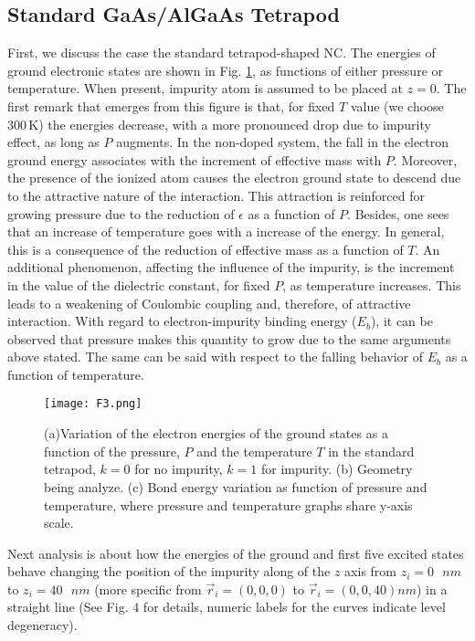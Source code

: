 \documentclass[nanomaterials,article,submit,moreauthors,pdftex]{Definitions/mdpi}
\begin{document}
\subsection{Standard GaAs/AlGaAs Tetrapod}
First, we discuss the case the standard tetrapod-shaped NC. The energies of ground electronic states are shown in Fig. \ref{F3}, as functions of either pressure or temperature. When present, impurity atom is assumed to be placed at $z=0$. The first remark that emerges from this figure is that, for fixed $T$ value (we choose $300\,$K) the energies decrease, with a more pronounced drop due to impurity effect, as long as $P$ augments. In the non-doped system, the fall in the electron ground energy associates with the increment of effective mass with $P$. Moreover, the presence of the ionized atom causes the electron ground state to descend due to the attractive nature of the interaction. This attraction is reinforced for growing pressure due to the reduction of $\epsilon$ as a function of $P$. Besides, one sees that an increase of temperature goes with a increase of the energy. In general, this is a consequence of the reduction of effective mass as a function of $T$. An additional phenomenon, affecting the influence of the impurity, is the increment in the value of the dielectric constant, for fixed $P$, as temperature increases. This leads to a weakening of Coulombic coupling and, therefore, of attractive interaction. With regard to electron-impurity binding energy ($E_b$), it can be observed that pressure makes this quantity to grow due to the same arguments above stated. The same can be said with respect to the falling behavior of $E_b$ as a function of temperature.

\begin{figure}[H]
	\centering	\texttt{[image: F3.png]}
	\caption{(a)Variation of the electron energies of the ground states as a function of the pressure, $P$ and the temperature $T$ in the standard tetrapod, $k=0$ for no impurity, $k=1$ for impurity. (b) Geometry being analyze. (c) Bond energy variation as function of pressure and temperature, where pressure and temperature graphs share y-axis scale.}
    \label{F3}
\end{figure}

Next analysis is about how the energies of the ground and first five excited states behave changing the position of the impurity along of the $z$ axis from $z_{i}=0\text{ }nm$ to $z_{i}=40\text{ }nm$ (more specific from $\vec{r}_{i}=(0,0,0)$ to $\vec{r}_{i}=(0,0,40) nm$) in a straight line (See Fig. 4 for details, numeric labels for the curves indicate level degeneracy).
\end{document}
